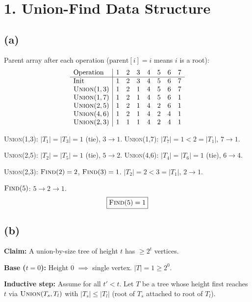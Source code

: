 \documentclass[11pt]{article}
\begin{document}
\section*{1. Union-Find Data Structure}

\vspace{-10pt}
\subsection*{(a)}

Parent array after each operation ($\mathrm{parent}[i] = i$ means $i$ is a root):
\[
\begin{array}{l|ccccccc}
\text{Operation} & 1 & 2 & 3 & 4 & 5 & 6 & 7 \\ \hline
\text{Init} & 1 & 2 & 3 & 4 & 5 & 6 & 7 \\
\textsc{Union}(1,3) & 1 & 2 & 1 & 4 & 5 & 6 & 7 \\
\textsc{Union}(1,7) & 1 & 2 & 1 & 4 & 5 & 6 & 1 \\
\textsc{Union}(2,5) & 1 & 2 & 1 & 4 & 2 & 6 & 1 \\
\textsc{Union}(4,6) & 1 & 2 & 1 & 4 & 2 & 4 & 1 \\
\textsc{Union}(2,3) & 1 & 1 & 1 & 4 & 2 & 4 & 1
\end{array}
\]

\textsc{Union}(1,3): $|T_1|=|T_3|=1$ (tie), $3 \to 1$. \quad
\textsc{Union}(1,7): $|T_7|=1 < 2=|T_1|$, $7 \to 1$.

\textsc{Union}(2,5): $|T_2|=|T_5|=1$ (tie), $5 \to 2$. \quad
\textsc{Union}(4,6): $|T_4|=|T_6|=1$ (tie), $6 \to 4$.

\textsc{Union}(2,3): $\textsc{Find}(2)=2$, $\textsc{Find}(3)=1$. $|T_2|=2 < 3=|T_1|$, $2 \to 1$.

$\textsc{Find}(5)$: $5 \to 2 \to 1$.
\[\boxed{\textsc{Find}(5) = 1}\]

\vspace{-20pt}
\subsection*{(b)}

\textbf{Claim:} A union-by-size tree of height $t$ has $\ge 2^t$ vertices.

\textbf{Base ($t = 0$):} Height $0$ $\implies$ single vertex. $|T| = 1 \ge 2^0$. \checkmark

\textbf{Inductive step:} Assume for all $t' < t$. Let $T$ be a tree whose height first reaches $t$ via $\textsc{Union}(T_s, T_l)$ with $|T_s| \le |T_l|$ (root of $T_s$ attached to root of $T_l$).
\end{document}
